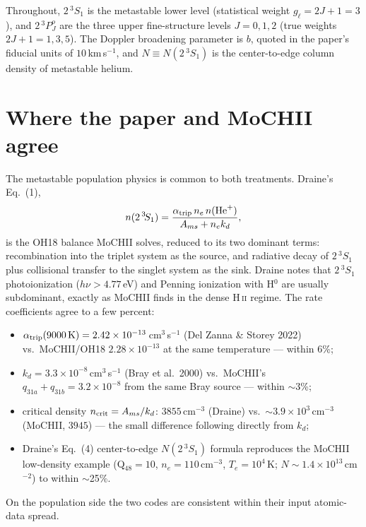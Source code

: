 \documentclass[english,a4paper]{my_memo}
\newcommand{\HII}{H\,\textsc{ii}}
\newcommand{\tSSS}{2\,^3\!S_1}
\newcommand{\tPPP}{2\,^3\!P^o_J}
\newcommand{\gl}{g_\ell}
\begin{document}
Throughout, $\tSSS$ is the metastable lower level (statistical weight
$\gl = 2J+1 = 3$), and $\tPPP$ are the three upper fine-structure levels
$J = 0, 1, 2$ (true weights $2J+1 = 1, 3, 5$).  The Doppler broadening
parameter is $b$, quoted in the paper's fiducial units of $10$\,km\,s$^{-1}$,
and $N \equiv N(\tSSS)$ is the center-to-edge column density of metastable
helium.

\section{Where the paper and MoCHII agree}
The metastable population physics is common to both treatments.  Draine's
Eq.~(1),
\begin{equation}
  n(\tSSS) = \frac{\alpha_{\rm trip}\, n_e\, n({\rm He}^+)}
                  {A_{ms} + n_e k_d},
\end{equation}
is the OH18 balance MoCHII solves, reduced to its two dominant terms:
recombination into the triplet system as the source, and radiative decay
of $\tSSS$ plus collisional transfer to the singlet system as the sink.
Draine notes that $\tSSS$ photoionization ($h\nu > 4.77$\,eV) and Penning
ionization with H$^0$ are usually subdominant, exactly as MoCHII finds in
the dense \HII{} regime.  The rate coefficients agree to a few percent:
\begin{itemize}\itemsep2pt
  \item $\alpha_{\rm trip}(9000\,{\rm K}) = 2.42\times10^{-13}$\,cm$^3$\,s$^{-1}$
        (Del Zanna \& Storey 2022) vs.\ MoCHII/OH18
        $2.28\times10^{-13}$ at the same temperature --- within 6\%;
  \item $k_d = 3.3\times10^{-8}$\,cm$^3$\,s$^{-1}$ (Bray et al.\ 2000) vs.\
        MoCHII's $q_{31a}+q_{31b} = 3.2\times10^{-8}$ from the same Bray
        source --- within $\sim$3\%;
  \item critical density $n_{\rm crit} = A_{ms}/k_d$: $3855$\,cm$^{-3}$
        (Draine) vs.\ $\sim$$3.9\times10^{3}$\,cm$^{-3}$ (MoCHII, $3945$)
        --- the small difference following directly from $k_d$;
  \item Draine's Eq.~(4) center-to-edge $N(\tSSS)$ formula reproduces the
        MoCHII low-density example (Q$_{48}=10$, $n_e = 110$\,cm$^{-3}$,
        $T_e = 10^4$\,K; $N \sim 1.4\times10^{13}$\,cm$^{-2}$) to within
        $\sim$25\%.
\end{itemize}
On the population side the two codes are consistent within their input
atomic-data spread.
\end{document}
